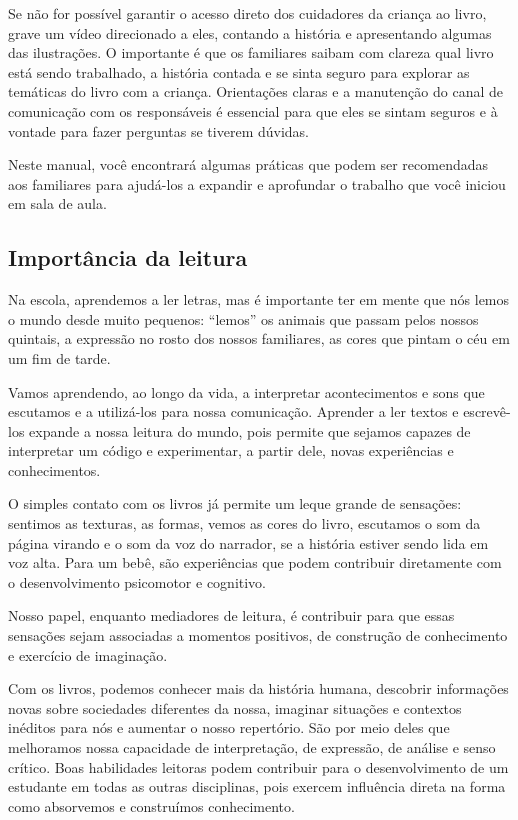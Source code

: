 \documentclass[11pt]{extarticle}
\begin{document}
Se não for possível garantir o acesso direto dos cuidadores da criança ao livro, 
grave um vídeo direcionado a eles, contando a história e apresentando algumas 
das ilustrações. O importante é que os familiares saibam com clareza qual livro 
está sendo trabalhado, a história contada e se sinta seguro para explorar as temáticas 
do livro com a criança. Orientações claras e a manutenção do canal de comunicação com 
os responsáveis é essencial para que eles se sintam seguros e à vontade para fazer perguntas 
se tiverem dúvidas. 

Neste manual, você encontrará algumas práticas que podem ser 
recomendadas aos familiares para ajudá-los a expandir e aprofundar o trabalho 
que você iniciou em sala de aula.


\subsection{Importância da leitura}
Na escola, aprendemos a ler letras, mas é importante ter em mente que nós 
lemos o mundo desde muito pequenos: “lemos” os animais que passam pelos nossos 
quintais, a expressão no rosto dos nossos familiares, as cores que pintam o céu 
em um fim de tarde. 

Vamos aprendendo, ao longo da vida, a interpretar acontecimentos 
e sons que escutamos e a utilizá-los para nossa comunicação. Aprender a ler textos e 
escrevê-los expande a nossa leitura do mundo, pois permite que sejamos capazes de 
interpretar um código e experimentar, a partir dele, novas experiências e conhecimentos. 

O simples contato com os livros já permite um leque grande de sensações: 
sentimos as texturas, as formas, vemos as cores do livro, escutamos o som da página 
virando e o som da voz do narrador, se a história estiver sendo lida em voz alta. Para um 
bebê, são experiências que podem contribuir diretamente com o desenvolvimento psicomotor 
e cognitivo. 

Nosso papel, enquanto mediadores de leitura, é contribuir para que essas 
sensações sejam associadas a momentos positivos, de construção de 
conhecimento e exercício de imaginação. 

Com os livros, podemos conhecer mais da história humana, descobrir informações 
novas sobre sociedades diferentes da nossa, imaginar situações e contextos inéditos 
para nós e aumentar o nosso repertório. São por meio deles que melhoramos nossa 
capacidade de interpretação, de expressão, de análise e senso crítico. Boas habilidades 
leitoras podem contribuir para o desenvolvimento de um estudante em todas as outras 
disciplinas, pois exercem influência direta na forma como absorvemos e 
construímos conhecimento.
\end{document}
